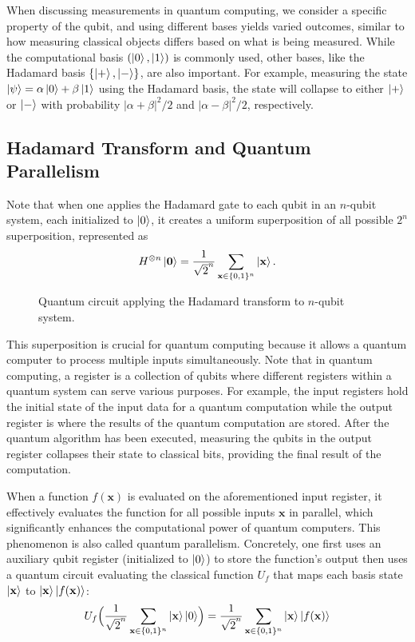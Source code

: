 \documentclass[cryptography,review,submit,pdftex,moreauthors,amsmath,amssymb,aps,strict]{Definitions/mdpi}
\begin{document}
When discussing measurements in quantum computing, we consider a specific property of the qubit, and using different bases yields varied outcomes, similar to how measuring classical objects differs based on what is being measured. While the computational basis $(\ket{0},\ket{1})$ is commonly used, other bases, like the Hadamard basis $\{\ket{+},\ket{-}\}$, are also important. For example, measuring the state $\ket{\psi}=\alpha\ket{0}+\beta\ket{1}$ using the Hadamard basis, the state will collapse to either $\ket{+}$ or $\ket{-}$ with probability $|\alpha+\beta|^2/2$ and $|\alpha-\beta|^2/2$, respectively. 

\subsection{Hadamard Transform and Quantum Parallelism}
Note that when one applies the Hadamard gate to each qubit in an $n$-qubit system, each initialized to $\ket{0}$, it creates a uniform superposition of all possible  $2^n$ superposition, represented as  
\begin{align}
    H^{\otimes n}\ket{\mathbf{0}}=\frac{1}{\sqrt{2}^n}\sum_{\mathbf{x}\in\{0,1\}^n}\ket{\mathbf{x}}.
\end{align}

\begin{figure}[!htbp]
    \center
    
    \caption{Quantum circuit applying the Hadamard transform to $n$-qubit system.}
    \label{fig:fig:hadamard-transform}
\end{figure}

This superposition is crucial for quantum computing because it allows a quantum computer to process multiple inputs simultaneously. Note that in quantum computing, a register is a collection of qubits where different registers within a quantum system can serve various purposes. For example, the input registers hold the initial state of the input data for a quantum computation while the output register is where the results of the quantum computation are stored. After the quantum algorithm has been executed, measuring the qubits in the output register collapses their state to classical bits, providing the final result of the computation.

When a function $f(\mathbf{x})$ is evaluated on the aforementioned input register, it effectively evaluates the function for all possible inputs $\mathbf{x}$ in parallel, which significantly enhances the computational power of quantum computers. This phenomenon is also called quantum parallelism. Concretely, one first uses an auxiliary qubit register (initialized to $\ket{0}$) to store the function's output then uses a quantum circuit evaluating the classical function $U_f$ that maps each basis state $\ket{\mathbf{x}}$ to $\ket{\mathbf{x}}\ket{f(\mathbf{x})}$:
\begin{align}
U_f\Bigl(\frac{1}{\sqrt{2}^n}\sum_{\mathbf{x}\in\{0,1\}^n}\ket{\mathbf{x}}\ket{0}\Bigr) = \frac{1}{\sqrt{2}^n}\sum_{\mathbf{x}\in\{0,1\}^n}\ket{\mathbf{x}}\ket{f(\mathbf{x})}
\end{align}
\end{document}
